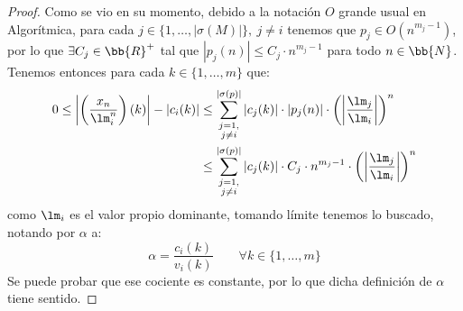 \begin{prop}
\begin{proof}
        Como se vio en su momento, debido a la notación $O$ grande usual en Algorítmica, para cada $j\in \{1,\dots,|\sigma(M)|\},~j\neq i$ tenemos que $p_j\in O(n^{m_j-1})$, por lo que $\exists C_j\in \bb{R}^+$ tal que $|p_j(n)|\leq C_j\cdot n^{m_j-1}$ para todo $n\in \bb{N}$. Tenemos entonces para cada $k\in \{1,\dots,m\}$ que:
        \begin{align*}
            0\leq \left|\left(\frac{x_n}{\lm_i^n}\right)(k)\right|-|c_i(k)| &\leq 
            \sum_{\substack{j=1,\\j\neq i}}^{| \sigma(p)|} |c_j(k)|\cdot |p_j(n)|\cdot \left(\left|\frac{\lm_j}{\lm_i}\right|\right)^n \\
            &\leq \sum_{\substack{j=1,\\j\neq i}}^{| \sigma(p)|} |c_j(k)|\cdot C_j\cdot n^{m_j-1}\cdot \left(\left|\frac{\lm_j}{\lm_i}\right|\right)^n
        \end{align*}
        como $\lm_i$ es el valor propio dominante, tomando límite tenemos lo buscado, notando por $\alpha$ a:
        \begin{equation*}
            \alpha = \frac{c_i(k)}{v_i(k)} \qquad \forall k\in \{1,\dots,m\}
        \end{equation*}
        Se puede probar que ese cociente es constante, por lo que dicha definición de $\alpha$ tiene sentido.
    \end{proof}
\end{prop}

